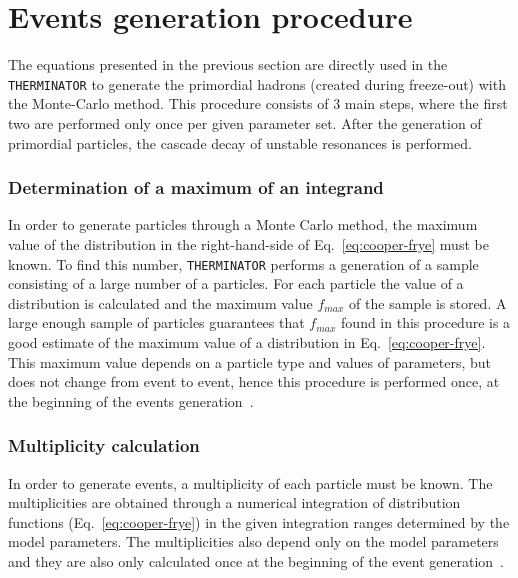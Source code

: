   \section{Events generation procedure}
  \label{sec:events-generation}
    The equations presented in the previous section are directly used in the \verb|THERMINATOR| to generate the primordial hadrons (created during freeze-out) with the Monte-Carlo method.
    This procedure consists of 3 main steps, where the first two are performed only once per given parameter set.
    After the generation of primordial particles, the cascade decay of unstable resonances is performed.
    \subsubsection{Determination of a maximum of an integrand}
      In order to generate particles through a Monte Carlo method, the maximum value of the distribution in the right-hand-side of Eq.~\ref{eq:cooper-frye} must be known.
      To find this number, \verb|THERMINATOR| performs a generation of a sample consisting of a large number of a particles.
      For each particle the value of a distribution is calculated and the maximum value $f_{max}$ of the sample is stored.
      A large enough sample of particles guarantees that $f_{max}$ found in this procedure is a good estimate of the maximum value of a distribution in Eq.~\ref{eq:cooper-frye}.
      This maximum value depends on a particle type and values of parameters, but does not change from event to event, hence this procedure is performed once, at the beginning of the events generation~\cite{therminator}.
    \subsubsection{Multiplicity calculation}
      In order to generate events, a multiplicity of each particle must be known.
      The multiplicities are obtained through a numerical integration of distribution functions (Eq.~\ref{eq:cooper-frye}) in the given integration ranges determined by the model parameters.
      The multiplicities also depend only on the model parameters and they are also only calculated once at the beginning of the event generation~\cite{therminator}.

